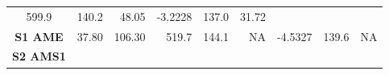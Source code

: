 \documentclass[]{article}
\begin{document}
\begin{longtable}[]{@{}crrrrrrrr@{}}
\begin{minipage}[t]{0.06\columnwidth}
599.9\strut
\end{minipage} & \begin{minipage}[t]{0.07\columnwidth}\raggedleft\strut
140.2\strut
\end{minipage} & \begin{minipage}[t]{0.07\columnwidth}\raggedleft\strut
48.05\strut
\end{minipage} & \begin{minipage}[t]{0.05\columnwidth}\raggedleft\strut
-3.2228\strut
\end{minipage} & \begin{minipage}[t]{0.13\columnwidth}\raggedleft\strut
137.0\strut
\end{minipage} & \begin{minipage}[t]{0.13\columnwidth}\raggedleft\strut
31.72\strut
\end{minipage}\tabularnewline
\begin{minipage}[t]{0.08\columnwidth}\centering\strut
\textbf{S1 AME}\strut
\end{minipage} & \begin{minipage}[t]{0.09\columnwidth}\raggedleft\strut
37.80\strut
\end{minipage} & \begin{minipage}[t]{0.06\columnwidth}\raggedleft\strut
106.30\strut
\end{minipage} & \begin{minipage}[t]{0.06\columnwidth}\raggedleft\strut
519.7\strut
\end{minipage} & \begin{minipage}[t]{0.07\columnwidth}\raggedleft\strut
144.1\strut
\end{minipage} & \begin{minipage}[t]{0.07\columnwidth}\raggedleft\strut
NA\strut
\end{minipage} & \begin{minipage}[t]{0.05\columnwidth}\raggedleft\strut
-4.5327\strut
\end{minipage} & \begin{minipage}[t]{0.13\columnwidth}\raggedleft\strut
139.6\strut
\end{minipage} & \begin{minipage}[t]{0.13\columnwidth}\raggedleft\strut
NA\strut
\end{minipage}\tabularnewline
\begin{minipage}[t]{0.08\columnwidth}\centering\strut
\textbf{S2 AMS1}\strut
\end{minipage} & \begin{minipage}[t]{0.09\columnwidth}\raggedleft\strut

\end{minipage}
\end{longtable}
\end{document}
